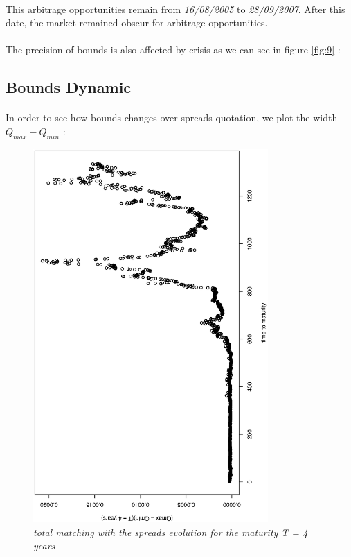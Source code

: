 \paragraph{}
This   arbitrage   opportunities   remain   from  {\it   16/08/2005}   to   {\it
  28/09/2007}. After this date, the market remained obscur for arbitrage opportunities.
\paragraph{}
The precision  of bounds  is also  affected by crisis  as we  can see  in figure
\ref{fig:9} :


\subsection{Bounds Dynamic}
\label{sec:bounds-effectiveness}
\paragraph{}
In order  to see how  bounds changes over spreads  quotation, we plot  the width
$Q_{max}-Q_{min}$ :
\begin{figure}[H]
  \centering
  \includegraphics[angle=-90,width=0.8\textwidth]{bounds_Dynamic_T_4}
  \caption{\it total matching with the spreads evolution for the maturity T = 4 years}
  \label{fig:10}
\end{figure}

